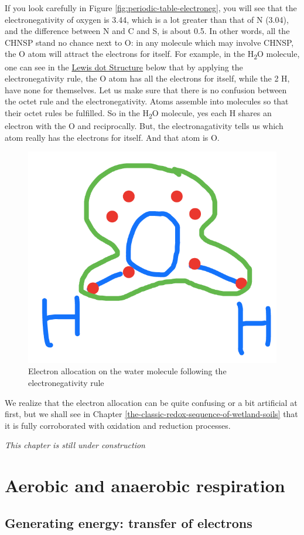 \documentclass[]{book}
\theoremstyle{definition}
\theoremstyle{definition}
\theoremstyle{definition}
\theoremstyle{remark}
\begin{document}
If you look carefully in Figure \ref{fig:periodic-table-electroneg}, you
will see that the electronegativity of oxygen is 3.44, which is a lot
greater than that of N (3.04), and the difference between N and C and S,
is about 0.5. In other words, all the CHNSP stand no chance next to O:
in any molecule which may involve CHNSP, the O atom will attract the
electrons for itself. For example, in the H\textsubscript{2}O molecule,
one can see in the \protect\hyperlink{Lewis-structure}{Lewis dot
Structure} below that by applying the electronegativity rule, the O atom
has all the electrons for itself, while the 2 H, have none for
themselves. Let us make sure that there is no confusion between the
octet rule and the electronegativity. Atoms assemble into molecules so
that their octet rules be fulfilled. So in the H\textsubscript{2}O
molecule, yes each H shares an electron with the O and reciprocally.
But, the electronagativity tells us which atom really has the electrons
for itself. And that atom is O.

\begin{figure}

{\centering \includegraphics[width=0.25\linewidth]{pictures/ElecAlloc_H2O} 

}

\caption{Electron allocation on the water molecule following the electronegativity rule}\label{fig:elecalloc-H2O}
\end{figure}

We realize that the electron allocation can be quite confusing or a bit
artificial at first, but we shall see in Chapter
\ref{the-classic-redox-sequence-of-wetland-soils} that it is fully
corroborated with oxidation and reduction processes.

\emph{This chapter is still under construction}

\chapter{Aerobic and anaerobic
respiration}\label{aerobic-and-anaerobic-respiration}

\section{Generating energy: transfer of
electrons}\label{generating-energy-transfer-of-electrons}
\end{document}
